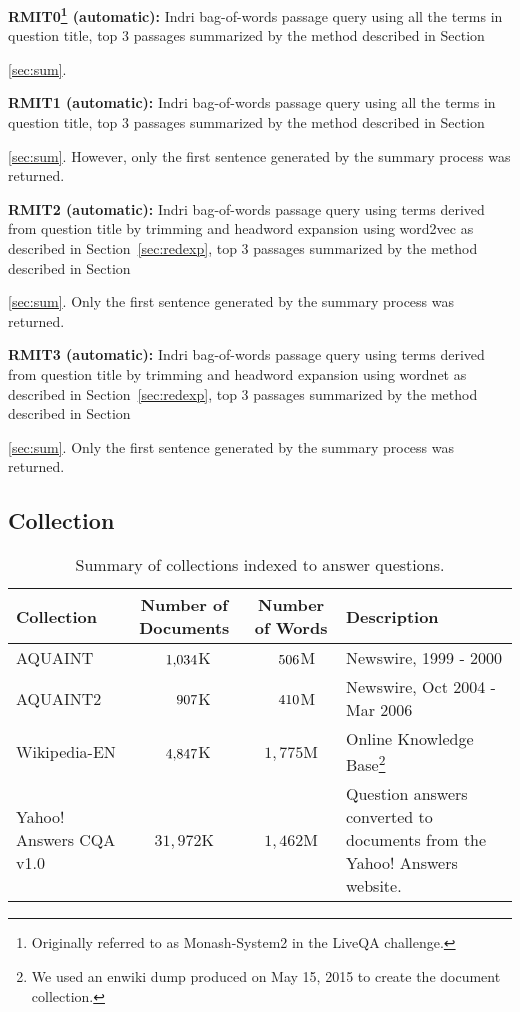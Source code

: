 \documentclass[a4paper,10pt,conference,compsocconf,final]{IEEEtran}
\newcommand\method[1]{{\sf\small{#1}}}
\def\D{\hphantom{1}}
\def\C{\hphantom{1,}}
\begin{document}
\noindent\textbf{RMIT0\footnote{Originally referred to as Monash-System2 in the
LiveQA challenge.} (automatic): } Indri bag-of-words passage query using all
the terms in question title, top 3 passages summarized by the method described
in Section~{\ref{sec:sum}.

\medskip

\noindent\textbf{RMIT1 (automatic): } Indri bag-of-words passage query using
all the terms in question title, top 3 passages summarized by the method
described in Section~{\ref{sec:sum}.  However, only the first sentence
generated by the summary process was returned.

\medskip

\noindent\textbf{RMIT2 (automatic): } Indri bag-of-words passage query using
terms derived from question title by trimming and headword expansion using
\method{word2vec} as described in Section~{\ref{sec:redexp}}, top 3 passages
summarized by the method described in Section~{\ref{sec:sum}.  Only the first
sentence generated by the summary process was returned.

\medskip

\noindent\textbf{RMIT3 (automatic): } Indri bag-of-words passage query using
terms derived from question title by trimming and headword expansion using
\method{wordnet} as described in Section~{\ref{sec:redexp}}, top 3 passages
summarized by the method described in Section~{\ref{sec:sum}.  Only the first
sentence generated by the summary process was returned.

\medskip


\subsection{Collection}

\begin{table*}[!t]
\centering
\caption{Summary of collections indexed to answer questions.\label{tbl:col}}
\begin{tabular}{p{35mm}ccp{50mm}}
\toprule
{\bf Collection} & {\bf Number of Documents} & {\bf Number of Words} & {\bf Description} \\
\midrule
AQUAINT & $\D1{,}034$K & $\C506$M & Newswire, 1999 - 2000 \\
AQUAINT2 & $\D\C907$K & $\C410$M & Newswire, Oct 2004 - Mar 2006 \\
Wikipedia-EN & $\D4{,}847$K & $1{,}775$M & Online Knowledge Base\footnote{We used an enwiki dump produced on May 15, 2015 to create the document collection.} \\
Yahoo! Answers CQA v1.0 & $31{,}972$K & $1{,}462$M & Question answers converted to documents from the Yahoo! Answers website.
\\
\bottomrule
\end{tabular}
\end{table*}

}}}}
\end{document}
